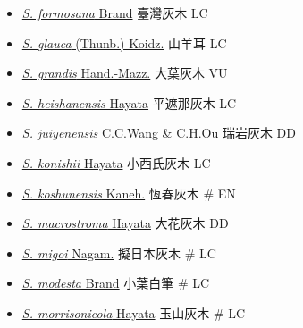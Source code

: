 \begin{itemize}
\begin{itemize}
        \item[] \href{http://www.theplantlist.org/tpl1.1/search?q=Symplocos+formosana}{\textit{S. formosana} Brand}   臺灣灰木   LC
        \item[] \href{http://www.theplantlist.org/tpl1.1/search?q=Symplocos+glauca}{\textit{S. glauca} (Thunb.) Koidz.}   山羊耳   LC
        \item[] \href{http://www.theplantlist.org/tpl1.1/search?q=Symplocos+grandis}{\textit{S. grandis} Hand.-Mazz.}   大葉灰木   VU
        \item[] \href{http://www.theplantlist.org/tpl1.1/search?q=Symplocos+heishanensis}{\textit{S. heishanensis} Hayata}   平遮那灰木   LC
        \item[] \href{http://www.theplantlist.org/tpl1.1/search?q=Symplocos+juiyenensis}{\textit{S. juiyenensis} C.C.Wang \& C.H.Ou}   瑞岩灰木   DD
        \item[] \href{http://www.theplantlist.org/tpl1.1/search?q=Symplocos+konishii}{\textit{S. konishii} Hayata}   小西氏灰木   LC
        \item[] \href{http://www.theplantlist.org/tpl1.1/search?q=Symplocos+koshunensis}{\textit{S. koshunensis} Kaneh.}   恆春灰木  \# EN
        \item[] \href{http://www.theplantlist.org/tpl1.1/search?q=Symplocos+macrostroma}{\textit{S. macrostroma} Hayata}   大花灰木   DD
        \item[] \href{http://www.theplantlist.org/tpl1.1/search?q=Symplocos+migoi}{\textit{S. migoi} Nagam.}   擬日本灰木  \# LC
        \item[] \href{http://www.theplantlist.org/tpl1.1/search?q=Symplocos+modesta}{\textit{S. modesta} Brand}   小葉白筆  \# LC
        \item[] \href{http://www.theplantlist.org/tpl1.1/search?q=Symplocos+morrisonicola}{\textit{S. morrisonicola} Hayata}   玉山灰木  \# LC

\end{itemize}
\end{itemize}
